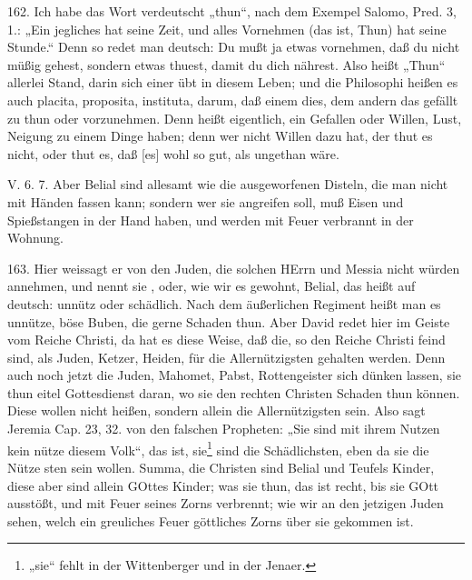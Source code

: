 162. Ich habe das Wort  verdeutscht „thun“, nach dem Exempel Salomo, Pred. 3, 1.: „Ein jegliches hat seine Zeit, und alles Vornehmen (das ist, Thun) hat seine Stunde.“ Denn so redet man deutsch: Du mußt ja etwas
vornehmen, daß du nicht müßig gehest, sondern etwas thuest, damit du dich nährest. Also heißt „Thun“ allerlei Stand, darin sich einer übt in diesem Leben; und die Philosophi heißen es auch placita, proposita, instituta, darum, daß einem dies, dem andern das gefällt zu thun oder vorzunehmen. Denn  heißt eigentlich, ein Gefallen oder Willen, Lust, Neigung zu einem Dinge haben; denn wer nicht Willen dazu hat, der thut es nicht, oder thut es, daß [es] wohl so gut, als ungethan wäre.

\begin{schriftzitat}
V. 6. 7. Aber Belial sind allesamt wie die ausgeworfenen Disteln, die man nicht mit Händen fassen kann; sondern wer sie angreifen soll, muß Eisen und Spießstangen in der Hand haben, und werden mit Feuer verbrannt in der Wohnung.
\end{schriftzitat}

163. Hier weissagt er von den Juden, die solchen HErrn und Messia nicht würden annehmen, und nennt sie , oder, wie wir es gewohnt, Belial, das heißt auf deutsch: unnütz oder schädlich. Nach dem äußerlichen Regiment heißt man es unnütze, böse Buben, die gerne Schaden thun. Aber David redet hier im Geiste vom Reiche Christi, da hat es diese Weise, daß die, so den Reiche Christi feind sind, als Juden, Ketzer, Heiden, für die Allernützigsten gehalten werden. Denn auch noch jetzt die Juden, Mahomet, Pabst, Rottengeister sich dünken lassen, sie thun eitel Gottesdienst daran, wo sie den rechten Christen Schaden thun können. Diese wollen nicht  heißen, sondern allein die Allernützigsten sein. Also sagt Jeremia Cap. 23, 32. von den falschen Propheten: „Sie sind mit ihrem Nutzen kein nütze diesem Volk“, das ist, sie\footnote{„sie“ fehlt in der Wittenberger und in der Jenaer.} sind die Schädlichsten, eben da sie die Nütze sten sein wollen. Summa, die Christen sind Belial und Teufels Kinder, diese aber sind allein GOttes Kinder; was sie thun, das ist recht, bis sie GOtt ausstößt, und mit Feuer seines Zorns verbrennt; wie wir an den jetzigen Juden sehen, welch ein greuliches Feuer göttliches Zorns über sie gekommen ist.

